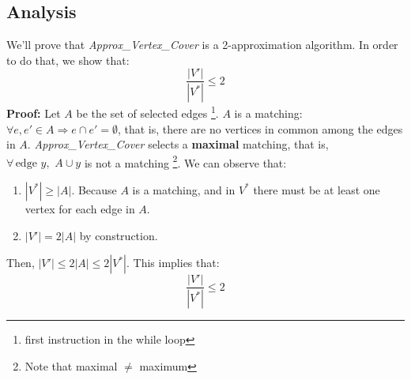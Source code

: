 \subsection{Analysis}
We'll prove that \textit{Approx\_Vertex\_Cover} is a 2-approximation algorithm. In order to do that, we show that:
\[\frac{|V'|}{|V^*|} \leq 2\]
\textbf{Proof:}\newline
Let $A$ be the set of selected edges \footnote{first instruction in the while loop}. $A$ is a matching: $\forall e, e' \in A \Rightarrow e \cap e' = \emptyset$, that is, there are no vertices in common among the edges in $A$.\newline\newline
\textit{Approx\_Vertex\_Cover} selects a \textbf{maximal} matching, that is, $\forall\, \text{edge } y, \,\, A \cup y$ is not a matching \footnote{Note that maximal $\neq$ maximum}.\newline\newline
We can observe that:
\begin{enumerate}
    \item $|V^*| \geq |A|$. Because $A$ is a matching, and in $V^*$ there must be at least one vertex for each edge in $A$.

    \item $|V'| = 2|A|$ by construction.
\end{enumerate}
Then, $|V'| \leq 2|A| \leq 2|V^*|$. This implies that:
\[\frac{|V'|}{|V^*|} \leq 2\]


